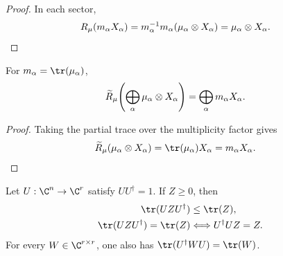 \begin{proof}\leanok
    In each sector,
    \begin{align}
        R_\mu(m_\alpha X_\alpha)
         & =m_\alpha^{-1}m_\alpha(\mu_\alpha\otimes X_\alpha)
        =\mu_\alpha\otimes X_\alpha.
        \notag
    \end{align}
\end{proof}

\begin{lemma}
    \label{lem:mpdo_retained_vertical_sector_partial_trace}
    \leanok
    For $m_\alpha=\tr(\mu_\alpha)$,
    \begin{align}
        \widetilde R_\mu\!\left(\bigoplus_\alpha\mu_\alpha\otimes X_\alpha\right)
         & =\bigoplus_\alpha m_\alpha X_\alpha.
        \notag
    \end{align}
\end{lemma}

\begin{proof}\leanok
    Taking the partial trace over the multiplicity factor gives
    \begin{align}
        \widetilde R_\mu(\mu_\alpha\otimes X_\alpha)
         & =\tr(\mu_\alpha)X_\alpha
        =m_\alpha X_\alpha.
        \notag
    \end{align}
\end{proof}

\begin{lemma}
    \label{lem:mpdo_coisometric_compression_trace}
    \leanok
    Let $U:\C^n\to\C^r$ satisfy $UU^\dagger=1$. If $Z\geq0$, then
    \begin{align}
        \tr(UZU^\dagger)
         & \leq\tr(Z),
        \notag                                 \\
        \tr(UZU^\dagger)=\tr(Z)
         & \Longleftrightarrow U^\dagger UZ=Z.
        \notag
    \end{align}
    For every $W\in\C^{r\times r}$, one also has
    $\tr(U^\dagger WU)=\tr(W)$.
\end{lemma}

